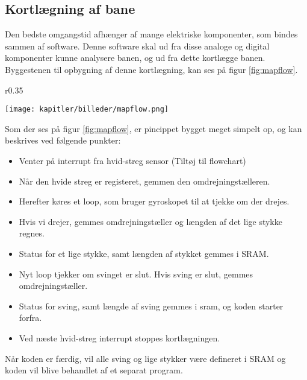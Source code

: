 \newpage
\subsection{Kortlægning af bane}
\label{sub:mapning}
Den bedste omgangstid afhænger af mange elektriske komponenter, som bindes sammen af software.
Denne software skal ud fra disse analoge og digital komponenter kunne analysere banen, og ud fra dette
kortlægge banen. Byggestenen til opbygning af denne kortlægning, kan ses på figur \ref{fig:mapflow}.

\begin{wrapfigure}{r}{0.35\textwidth}
  \vspace{-10pt}
  \begin{center}
      \texttt{[image: kapitler/billeder/mapflow.png]}
    \end{center}
    \vspace{-10pt}
    \caption{Viser grundstenene af koden til kortlægning af banen.}
    \label{fig:mapflow}
\end{wrapfigure}

Som der ses på figur \ref{fig:mapflow}, er pincippet bygget meget simpelt op, og kan beskrives ved følgende punkter:

\begin{itemize}
\item Venter på interrupt fra hvid-streg sensor (Tiltøj til flowchart)
\item Når den hvide streg er registeret, gemmen den omdrejningstælleren.
\item Herefter køres et loop, som bruger gyroskopet til at tjekke om der drejes.
\item Hvis vi drejer, gemmes omdrejningstæller og længden af det lige stykke regnes.
\item Status for et lige stykke, samt længden af stykket gemmes i SRAM.
\item Nyt loop tjekker om svinget er slut. Hvis sving er slut, gemmes omdrejningstæller.
\item Status for sving, samt længde af sving gemmes i sram, og koden starter forfra.
\item Ved næste hvid-streg interrupt stoppes kortlægningen.
\end{itemize}

Når koden er færdig, vil alle sving og lige stykker være defineret i SRAM og koden vil blive behandlet
af et separat program.
